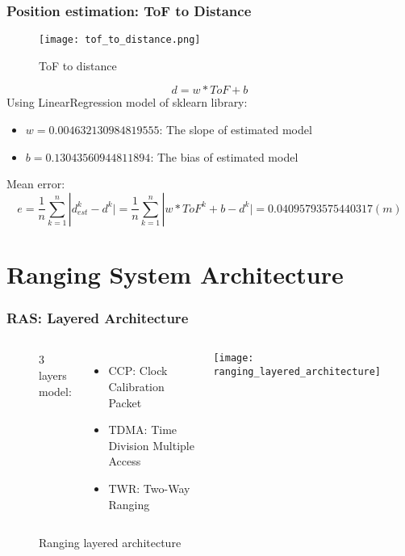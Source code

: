 \documentclass[10pt]{beamer}
\begin{document}
\begin{frame}
    \frametitle{Position estimation: ToF to Distance}
    \begin{figure}[H]
        \centering
        \texttt{[image: tof\_to\_distance.png]}
        \caption{ToF to distance}
    \end{figure}
    \begin{equation}
        d = w*ToF + b
        \label{eqn:distance_model}
    \end{equation}
    Using LinearRegression model of sklearn library:
    \begin{itemize}
        \item $w = 0.004632130984819555$: The slope of estimated model 
        \item $b = 0.13043560944811894$: The bias of estimated model
    \end{itemize}
    Mean error:
    \begin{equation*}
        e = \frac{1}{n} \sum_{k = 1}^{n} | d^k_{est}-d^k \vert = \frac{1}{n} \sum_{k = 1}^{n} | w*ToF^k + b -d^k \vert  = 0.04095793575440317 (m)
        \label{eqn:distance_model_loss}
    \end{equation*}
\end{frame}

\section{Ranging System Architecture}

\begin{frame}
    \frametitle{RAS: Layered Architecture}
\begin{figure}[H]
    \begin{columns}
            3 layers model:
            \begin{itemize}
                \item CCP: Clock Calibration Packet
                \item TDMA: Time Division Multiple Access
                \item TWR: Two-Way Ranging
            \end{itemize}
            \begin{center}
                \texttt{[image: ranging\_layered\_architecture]}
            \end{center}
            \caption{Ranging layered architecture}
            \label{fig:ranging_layered_architecture}
    \end{columns}
\end{figure}
\end{frame}
\end{document}
